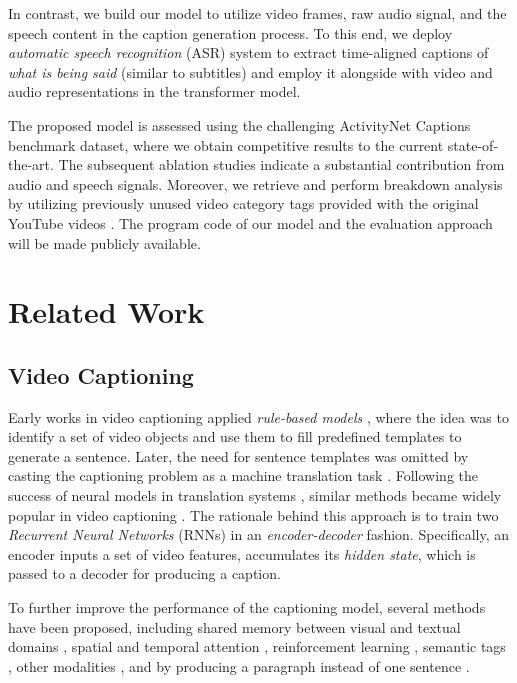 \documentclass[10pt,twocolumn,letterpaper]{article}
\begin{document}
In contrast, we build our model to utilize video frames, raw audio signal, and the speech content in the caption generation process. To this end, we deploy \textit{automatic speech recognition} (ASR) system \cite{YouTube} to extract time-aligned captions of \textit{what is being said} (similar to subtitles) and employ it alongside with video and audio representations in the transformer model. 

The proposed model is assessed using the challenging ActivityNet Captions \cite{Krishna2017} benchmark dataset, where we obtain competitive results to the current state-of-the-art. The subsequent ablation studies indicate a substantial contribution from audio and speech signals. Moreover, we retrieve and perform breakdown analysis by utilizing previously unused video category tags provided with the original YouTube videos \cite{YouTubeCats}. The program code of our model and the evaluation approach will be made publicly available. 

\section{Related Work}

\subsection{Video Captioning}

Early works in video captioning applied \textit{rule-based models} \cite{Kojima2002,MunWaiLee2008,Das2013}, where the idea was to identify a set of video objects and use them to fill predefined templates to generate a sentence. Later, the need for sentence templates was omitted by casting the captioning problem as a machine translation task \cite{Rohrbach2013}. Following the success of neural models in translation systems \cite{Sutskever2014}, similar methods became widely popular in video captioning \cite{Yao2015,Venugopalan2015,Venugopalan2015b,Yu2016,Baraldi2017,Shen2017,Hori2017,Donahue2017,Wu2018}. The rationale behind this approach is to train two \textit{Recurrent Neural Networks} (RNNs) in an \textit{encoder-decoder} fashion. Specifically, an encoder inputs a set of video features, accumulates its \textit{hidden state}, which is passed to a decoder for producing a caption. 

To further improve the performance of the captioning model, several methods have been proposed, including shared memory between visual and textual domains \cite{Wang2018a,Pei2019}, spatial and temporal attention \cite{Yan2019}, reinforcement learning \cite{Wang2018}, semantic tags \cite{Gan2017,Pan2017}, other modalities \cite{Xu2017,Hori2018,Wang2018b,Hao2017}, and by producing a paragraph instead of one sentence \cite{Rohrbach2014,Yu2016}.
\end{document}
